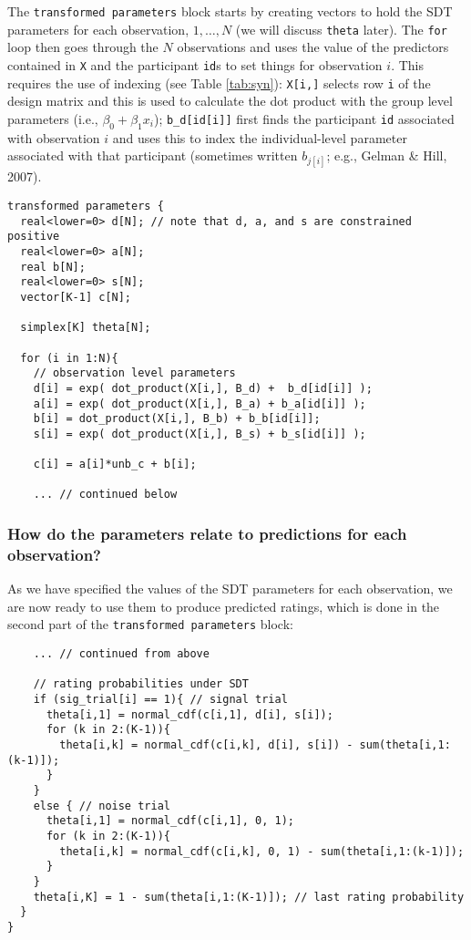 \documentclass[
  english,
  ,man,floatsintext]{apa6}
\begin{document}
The \texttt{transformed\ parameters} block starts by creating vectors to hold the SDT parameters for each observation, \(1,\ldots,N\) (we will discuss \texttt{theta} later). The \texttt{for} loop then goes through the \(N\) observations and uses the value of the predictors contained in \texttt{X} and the participant \texttt{id}s to set things for observation \(i\). This requires the use of indexing (see Table \ref{tab:syn}): \texttt{X{[}i,{]}} selects row \texttt{i} of the design matrix and this is used to calculate the dot product with the group level parameters (i.e., \(\beta_0 + \beta_1x_i\)); \texttt{b\_d{[}id{[}i{]}{]}} first finds the participant \texttt{id} associated with observation \(i\) and uses this to index the individual-level parameter associated with that participant (sometimes written \(b_{j[i]}\); e.g., Gelman \& Hill, 2007).

\begin{verbatim}
transformed parameters {
  real<lower=0> d[N]; // note that d, a, and s are constrained positive
  real<lower=0> a[N]; 
  real b[N];
  real<lower=0> s[N];
  vector[K-1] c[N];
  
  simplex[K] theta[N];

  for (i in 1:N){
    // observation level parameters
    d[i] = exp( dot_product(X[i,], B_d) +  b_d[id[i]] );
    a[i] = exp( dot_product(X[i,], B_a) + b_a[id[i]] );
    b[i] = dot_product(X[i,], B_b) + b_b[id[i]];
    s[i] = exp( dot_product(X[i,], B_s) + b_s[id[i]] );
    
    c[i] = a[i]*unb_c + b[i];

    ... // continued below
\end{verbatim}

\hypertarget{how-do-the-parameters-relate-to-predictions-for-each-observation}{%
\subsubsection{How do the parameters relate to predictions for each observation?}\label{how-do-the-parameters-relate-to-predictions-for-each-observation}}

As we have specified the values of the SDT parameters for each observation, we are now ready to use them to produce predicted ratings, which is done in the second part of the \texttt{transformed\ parameters} block:

\begin{verbatim}
    ... // continued from above

    // rating probabilities under SDT
    if (sig_trial[i] == 1){ // signal trial
      theta[i,1] = normal_cdf(c[i,1], d[i], s[i]);
      for (k in 2:(K-1)){
        theta[i,k] = normal_cdf(c[i,k], d[i], s[i]) - sum(theta[i,1:(k-1)]);
      }
    }
    else { // noise trial
      theta[i,1] = normal_cdf(c[i,1], 0, 1);
      for (k in 2:(K-1)){
        theta[i,k] = normal_cdf(c[i,k], 0, 1) - sum(theta[i,1:(k-1)]);
      }
    }
    theta[i,K] = 1 - sum(theta[i,1:(K-1)]); // last rating probability 
  }
}
\end{verbatim}
\end{document}
